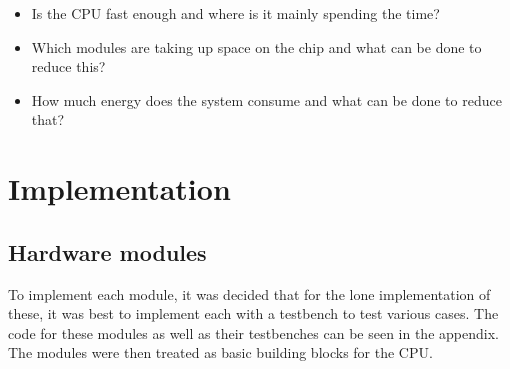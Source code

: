 \documentclass[12pt,a4paper]{article}
\begin{document}
	\begin{itemize}
		\item Is the CPU fast enough and where is it mainly spending the time?
		\item Which modules are taking up space on the chip and what can be done to reduce this?
		\item How much energy does the system consume and what can be done to reduce that?
	\end{itemize}
	
\section{Implementation}
\subsection{Hardware modules}
	To implement each module, it was decided that for the lone implementation of these, it was best to implement each with a testbench to test various cases. The code for these modules as well as their testbenches can be seen in the appendix.\\
	The modules were then treated as basic building blocks for the CPU.\\
	
\end{document}
